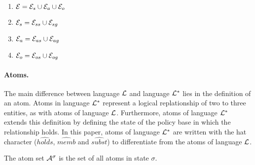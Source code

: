 \documentclass[10pt, twocolumn]{article}
\begin{document}
          \begin{enumerate}
            \item
              ${\cal E} = {\cal E}_{s} \cup {\cal E}_{a} \cup {\cal E}_{o}$
            \item
              ${\cal E}_{s} = {\cal E}_{ss} \cup {\cal E}_{sg}$
            \item
              ${\cal E}_{a} = {\cal E}_{as} \cup {\cal E}_{ag}$
            \item
              ${\cal E}_{o} = {\cal E}_{os} \cup {\cal E}_{og}$
          \end{enumerate}

        \paragraph{Atoms.}

          The main difference between language ${\cal L}$ and language
          ${\cal L}^{*}$ lies in the definition of an atom. Atoms in language
          ${\cal L}^{*}$ represent a logical replationship of two to three
          entities, as with atoms of language ${\cal L}$. Furthermore, atoms of
          language ${\cal L}^{*}$ extends this definition by defining the
          state of the policy base in which the relationship holds. In this
          paper, atoms of language ${\cal L}^{*}$ are written with the
          hat character ($\hat{holds}$, $\hat{memb}$ and $\hat{subst}$) to
          differentiate from the atoms of language ${\cal L}$.

          The atom set ${\cal A}^{\sigma}$ is the set of all atoms in state
          $\sigma$.
\end{document}

